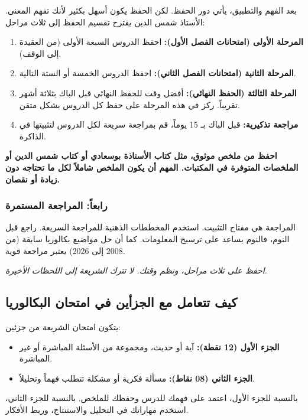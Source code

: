 \documentclass[12pt,a4paper]{book}
\newcommand{\quoteAr}[1]{%
	\begin{myquote}
		\itshape #1
	\end{myquote}
}
\newcommand{\importantAr}[1]{%
	\begin{important}
		\bfseries #1
	\end{important}
}
\begin{document}
	بعد الفهم والتطبيق، يأتي دور الحفظ. لكن الحفظ يكون أسهل بكثير لأنك تفهم المعنى. الأستاذ شمس الدين يقترح تقسيم الحفظ إلى ثلاث مراحل:
	
	\begin{enumerate}
		\item \textbf{المرحلة الأولى (امتحانات الفصل الأول):} احفظ الدروس السبعة الأولى (من العقيدة إلى الوقف).
		\item \textbf{المرحلة الثانية (امتحانات الفصل الثاني):} احفظ الدروس الخمسة أو الستة التالية.
		\item \textbf{المرحلة الثالثة (الحفظ النهائي):} أفضل وقت للحفظ النهائي قبل الباك بثلاثة أشهر تقريباً. ركز في هذه المرحلة على حفظ كل الدروس بشكل متقن.
		\item \textbf{مراجعة تذكيرية:} قبل الباك بـ 15 يوماً، قم بمراجعة سريعة لكل الدروس لتثبيتها في الذاكرة.
	\end{enumerate}
	
	\importantAr{احفظ من ملخص موثوق، مثل كتاب الأستاذة بوسعادي أو كتاب شمس الدين أو الملخصات المتوفرة في المكتبات. المهم أن يكون الملخص شاملاً لكل ما تحتاجه دون زيادة أو نقصان.}
	
	\subsubsection{رابعاً: المراجعة المستمرة}
	
	المراجعة هي مفتاح التثبيت. استخدم المخططات الذهنية للمراجعة السريعة. راجع قبل النوم، فالنوم يساعد على ترسيخ المعلومات. كما أن حل مواضيع بكالوريا سابقة (من 2008 إلى 2026) يعتبر مراجعة قوية.
	
	\quoteAr{احفظ على ثلاث مراحل، ونظم وقتك. لا تترك الشريعة إلى اللحظات الأخيرة.}
	
	\subsection{كيف تتعامل مع الجزأين في امتحان البكالوريا}
	
	يتكون امتحان الشريعة من جزئين:
	\begin{itemize}
		\item \textbf{الجزء الأول (12 نقطة):} آية أو حديث، ومجموعة من الأسئلة المباشرة أو غير المباشرة.
		\item \textbf{الجزء الثاني (08 نقاط):} مسألة فكرية أو مشكلة تتطلب فهماً وتحليلاً.
	\end{itemize}
	
	بالنسبة للجزء الأول، اعتمد على فهمك للدرس وحفظك للملخص. بالنسبة للجزء الثاني، استخدم مهاراتك في التحليل والاستنتاج، وربط الأفكار.
	
\end{document}
